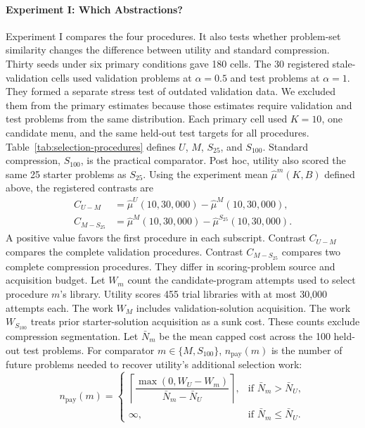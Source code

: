 \documentclass[10pt]{article}
\begin{document}
\paragraph{Experiment I: Which Abstractions?}
Experiment I compares the four procedures. It also tests whether problem-set
similarity changes the difference between utility and standard compression.
Thirty seeds under six primary conditions gave 180 cells. The 30 registered
stale-validation cells used validation problems at $\alpha=0.5$ and test
problems at $\alpha=1$. They formed a separate stress test of outdated
validation data. We excluded them from the primary estimates because those
estimates require validation and test problems from the same distribution.
Each primary cell used $K=10$, one candidate menu, and the same held-out test
targets for all procedures.
Table~\ref{tab:selection-procedures} defines $U$, $M$, $S_{25}$, and $S_{100}$.
Standard compression, $S_{100}$, is the practical comparator. Post hoc, utility
also scored the same 25 starter problems as $S_{25}$. Using the experiment mean
$\widehat\mu^{m}(K,B)$ defined above, the registered contrasts are
\begin{equation}
  \begin{aligned}
    C_{U-M}
      &=\widehat\mu^{U}(10,30{,}000)
        -\widehat\mu^{M}(10,30{,}000),\\
    C_{M-S_{25}}
      &=\widehat\mu^{M}(10,30{,}000)
        -\widehat\mu^{S_{25}}(10,30{,}000).
  \end{aligned}
\end{equation}
A positive value favors the first procedure in each subscript. Contrast
$C_{U-M}$ compares the complete validation procedures. Contrast $C_{M-S_{25}}$
compares two complete compression procedures. They differ in scoring-problem
source and acquisition budget.
Let $W_m$ count the candidate-program attempts used to select procedure $m$'s
library. Utility scores 455 trial libraries with at most 30,000 attempts each.
The work $W_M$ includes validation-solution acquisition. The work $W_{S_{100}}$
treats prior starter-solution acquisition as a sunk cost. These counts exclude
compression segmentation.
Let $\bar N_m$ be the mean capped cost across the 100 held-out test problems.
For comparator $m\in\{M,S_{100}\}$, $n_{\mathrm{pay}}(m)$ is the number of
future problems needed to recover utility's additional selection work:
\begin{equation}
  n_{\mathrm{pay}}(m)
  =
  \begin{cases}
    \left\lceil
      \dfrac{\max(0,W_U-W_m)}
            {\bar N_m-\bar N_U}
    \right\rceil,
      & \text{if } \bar N_m>\bar N_U,\\
    \infty,
      & \text{if } \bar N_m\leq\bar N_U.
  \end{cases}
\end{equation}
\end{document}
